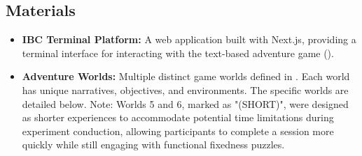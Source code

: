 \documentclass{article}
\begin{document}
\subsection{Materials}
\begin{itemize}
    \item \textbf{IBC Terminal Platform:} A web application built with Next.js, providing a terminal interface for interacting with the text-based adventure game ().
    \item \textbf{Adventure Worlds:} Multiple distinct game worlds defined in . Each world has unique narratives, objectives, and environments. The specific worlds are detailed below. Note: Worlds 5 and 6, marked as "(SHORT)", were designed as shorter experiences to accommodate potential time limitations during experiment conduction, allowing participants to complete a session more quickly while still engaging with functional fixedness puzzles.

\end{itemize}
\end{document}
